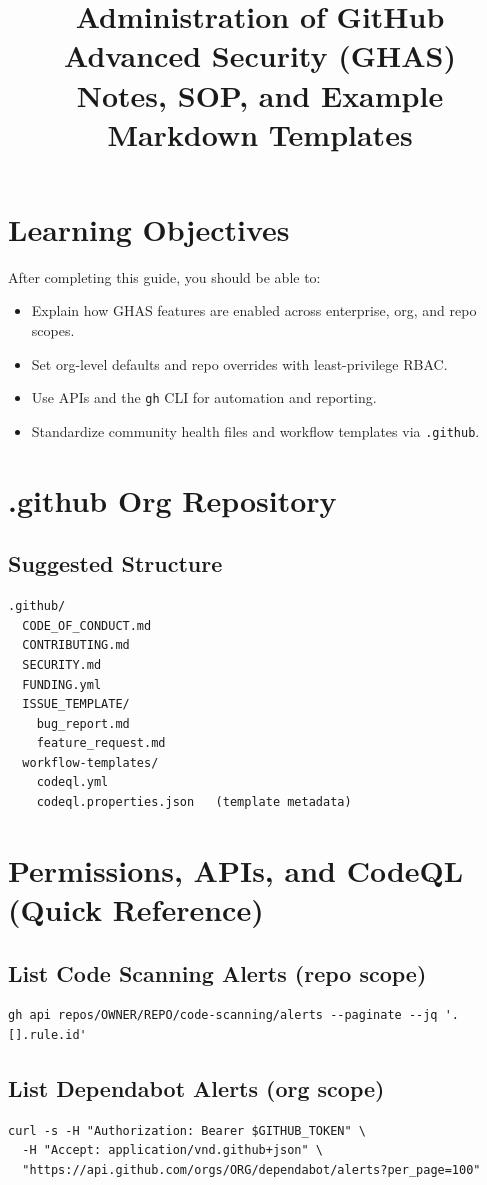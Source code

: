 \documentclass[11pt,letterpaper]{article}
\title{\textbf{Administration of GitHub Advanced Security (GHAS)}\\
\large Notes, SOP, and Example Markdown Templates}
\author{}
\date{}
\begin{document}
\maketitle

\section*{Learning Objectives}
After completing this guide, you should be able to:
\begin{itemize}
  \item Explain how GHAS features are enabled across enterprise, org, and repo scopes.
  \item Set org-level defaults and repo overrides with least-privilege RBAC.
  \item Use APIs and the \texttt{gh} CLI for automation and reporting.
  \item Standardize community health files and workflow templates via \texttt{.github}.
\end{itemize}

\section{.github Org Repository}
\subsection*{Suggested Structure}
\begin{verbatim}
.github/
  CODE_OF_CONDUCT.md
  CONTRIBUTING.md
  SECURITY.md
  FUNDING.yml
  ISSUE_TEMPLATE/
    bug_report.md
    feature_request.md
  workflow-templates/
    codeql.yml
    codeql.properties.json   (template metadata)
\end{verbatim}
\clearpage

\section{Permissions, APIs, and CodeQL (Quick Reference)}
\subsection*{List Code Scanning Alerts (repo scope)}
\begin{verbatim}
gh api repos/OWNER/REPO/code-scanning/alerts --paginate --jq '.[].rule.id'
\end{verbatim}

\subsection*{List Dependabot Alerts (org scope)}
\begin{verbatim}
curl -s -H "Authorization: Bearer $GITHUB_TOKEN" \
  -H "Accept: application/vnd.github+json" \
  "https://api.github.com/orgs/ORG/dependabot/alerts?per_page=100"
\end{verbatim}
\end{document}
